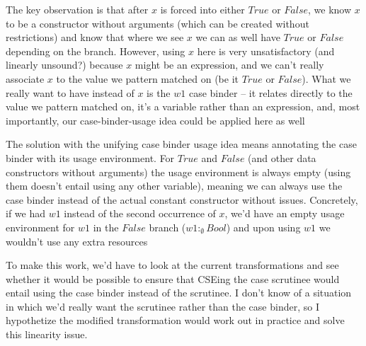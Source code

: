 \documentclass[]{lwnovathesis}
\begin{document}
The key observation is that after $x$ is forced into either $True$ or $False$,
we know $x$ to be a constructor without arguments (which can be created
without restrictions) and know that where we see $x$ we can as well have
$True$ or $False$ depending on the branch. However, using $x$ here is very
unsatisfactory (and linearly unsound?) because $x$ might be an expression, and
we can't really associate $x$ to the value we pattern matched on (be it $True$
or $False$). What we really want to have instead of $x$ is the $w1$ case binder --
it relates directly to the value we pattern matched on, it's a variable rather
than an expression, and, most importantly, our case-binder-usage idea could be
applied here as well


The solution with the unifying case binder usage idea means annotating the case
binder with its usage environment. For $True$ and $False$ (and other data
constructors without arguments) the usage environment is always empty (using
them doesn't entail using any other variable), meaning we can always use the
case binder instead of the actual constant constructor without issues.
%
Concretely, if we had $w1$ instead of the second occurrence of $x$, we'd have
an empty usage environment for $w1$ in the $False$ branch ($w1 :_\emptyset
Bool$) and upon using $w1$ we wouldn't use any extra resources


To make this work, we'd have to look at the current transformations and see
whether it would be possible to ensure that CSEing the case scrutinee would
entail using the case binder instead of the scrutinee. I don't know of a
situation in which we'd really want the scrutinee rather than the case binder,
so I hypothetize the modified transformation would work out in practice and
solve this linearity issue.


\end{document}

